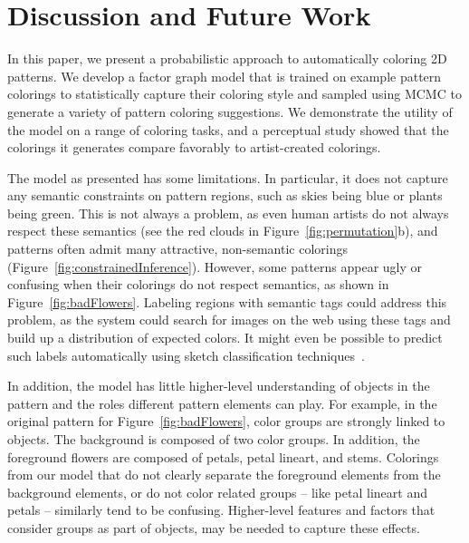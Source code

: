 \section{Discussion and Future Work}
\label{sec:discussion}

In this paper, we present a probabilistic approach to automatically coloring 2D patterns. We develop a factor graph model that is trained on example pattern colorings to statistically capture their coloring style and sampled using MCMC to generate a variety of pattern coloring suggestions. We demonstrate the utility of the model on a range of coloring tasks, and a perceptual study showed that the colorings it generates compare favorably to artist-created colorings.


The model as presented has some limitations. In particular, it does not capture any semantic constraints on pattern regions, such as skies being blue or plants being green. This is not always a problem, as even human artists do not always respect these semantics (see the red clouds in Figure~\ref{fig:permutation}b), and patterns often admit many attractive, non-semantic colorings (Figure~\ref{fig:constrainedInference}). However, some patterns appear ugly or confusing when their colorings do not respect semantics, as shown in Figure~\ref{fig:badFlowers}. Labeling regions with semantic tags could address this problem, as the system could search for images on the web using these tags and build up a distribution of expected colors. It might even be possible to predict such labels automatically using sketch classification techniques~\cite{SketchClassification}.~ 

In addition, the model has little higher-level understanding of objects in the pattern and the roles different pattern elements can play. For example, in the original pattern for Figure~\ref{fig:badFlowers}, color groups are strongly linked to objects. The background is composed of two color groups. In addition, the foreground flowers are composed of petals, petal lineart, and stems. Colorings from our model that do not clearly separate the foreground elements from the background elements, or do not color related groups -- like petal lineart and petals -- similarly tend to be confusing. Higher-level features and factors that consider groups as part of objects, may be needed to capture these effects.~~

